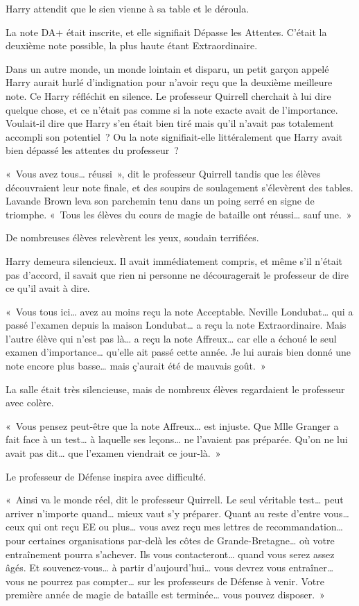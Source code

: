 Harry attendit que le sien vienne à sa table et le déroula.

La note DA+ était inscrite, et elle signifiait Dépasse les Attentes. C'était la deuxième note possible, la plus haute étant Extraordinaire.

Dans un autre monde, un monde lointain et disparu, un petit garçon appelé Harry aurait hurlé d'indignation pour n'avoir reçu que la deuxième meilleure note. Ce Harry réfléchit en silence. Le professeur Quirrell cherchait à lui dire quelque chose, et ce n'était pas comme si la note exacte avait de l'importance. Voulait-il dire que Harry s'en était bien tiré mais qu'il n'avait pas totalement accompli son potentiel~? Ou la note signifiait-elle littéralement que Harry avait bien dépassé les attentes du professeur~?

«~Vous avez tous… réussi~», dit le professeur Quirrell tandis que les élèves découvraient leur note finale, et des soupirs de soulagement s'élevèrent des tables. Lavande Brown leva son parchemin tenu dans un poing serré en signe de triomphe. «~Tous les élèves du cours de magie de bataille ont réussi… sauf une.~»

De nombreuses élèves relevèrent les yeux, soudain terrifiées.

Harry demeura silencieux. Il avait immédiatement compris, et même s'il n'était pas d'accord, il savait que rien ni personne ne découragerait le professeur de dire ce qu'il avait à dire.

«~Vous tous ici… avez au moins reçu la note Acceptable. Neville Londubat… qui a passé l'examen depuis la maison Londubat… a reçu la note Extraordinaire. Mais l'autre élève qui n'est pas là… a reçu la note Affreux… car elle a échoué le seul examen d'importance… qu'elle ait passé cette année. Je lui aurais bien donné une note encore plus basse… mais ç'aurait été de mauvais goût.~»

La salle était très silencieuse, mais de nombreux élèves regardaient le professeur avec colère.

«~Vous pensez peut-être que la note Affreux… est injuste. Que Mlle Granger a fait face à un test… à laquelle ses leçons… ne l'avaient pas préparée. Qu'on ne lui avait pas dit… que l'examen viendrait ce jour-là.~»

Le professeur de Défense inspira avec difficulté.

«~Ainsi va le monde réel, dit le professeur Quirrell. Le seul véritable test… peut arriver n'importe quand… mieux vaut s'y préparer. Quant au reste d'entre vous… ceux qui ont reçu EE ou plus… vous avez reçu mes lettres de recommandation… pour certaines organisations par-delà les côtes de Grande-Bretagne… où votre entraînement pourra s'achever. Ils vous contacteront… quand vous serez assez âgés. Et souvenez-vous… à partir d'aujourd'hui… vous devrez vous entraîner… vous ne pourrez pas compter… sur les professeurs de Défense à venir. Votre première année de magie de bataille est terminée… vous pouvez disposer.~»

